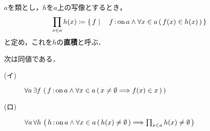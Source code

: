 	\begin{screen}
		\begin{dfn}[直積]
			$a$を類とし，$h$を$a$上の写像とするとき，
			\begin{align}
				\prod_{x \in a} h(x) \coloneqq
				\left\{\, f \mid \quad f \operatorname*{:on} a \wedge \forall x \in a\, (\, f(x) \in h(x)\, )\, \right\} 
			\end{align}
			と定め，これを$h$の{\bf 直積}と呼ぶ．
		\end{dfn}
	\end{screen}
	
	\begin{screen}
		\begin{thm}[選択公理と直積]
			次は同値である．
			\begin{description}
				\item[(イ)] $\forall a\, \exists f\, \left(\, f \operatorname*{:on} a \wedge \forall x \in a\, (\, x \neq \emptyset \Longrightarrow f(x) \in x\, )\, \right)$
				\item[(ロ)] $\forall a\, \forall h\, \left(\, h \operatorname*{:on} a \wedge \forall x \in a\, (\, h(x) \neq \emptyset\, )
				\Longrightarrow \prod_{x \in a} h(x) \neq \emptyset\, \right)$
			\end{description}
		\end{thm}
	\end{screen}
	
